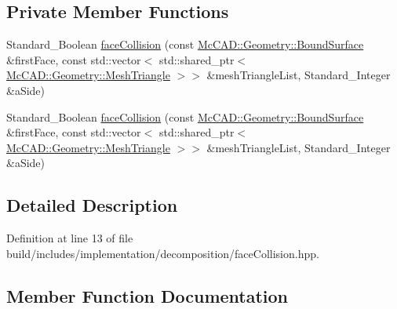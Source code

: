 \subsection*{Private Member Functions}
\begin{DoxyCompactItemize}
\item 
Standard\+\_\+\+Boolean \hyperlink{classMcCAD_1_1Decomposition_1_1FaceCollision_ab4dffccfd15895b37362d8f4a46dff0f}{face\+Collision} (const \hyperlink{classMcCAD_1_1Geometry_1_1BoundSurface}{Mc\+C\+A\+D\+::\+Geometry\+::\+Bound\+Surface} \&first\+Face, const std\+::vector$<$ std\+::shared\+\_\+ptr$<$ \hyperlink{classMcCAD_1_1Geometry_1_1MeshTriangle}{Mc\+C\+A\+D\+::\+Geometry\+::\+Mesh\+Triangle} $>$$>$ \&mesh\+Triangle\+List, Standard\+\_\+\+Integer \&a\+Side)
\item 
Standard\+\_\+\+Boolean \hyperlink{classMcCAD_1_1Decomposition_1_1FaceCollision_ab4dffccfd15895b37362d8f4a46dff0f}{face\+Collision} (const \hyperlink{classMcCAD_1_1Geometry_1_1BoundSurface}{Mc\+C\+A\+D\+::\+Geometry\+::\+Bound\+Surface} \&first\+Face, const std\+::vector$<$ std\+::shared\+\_\+ptr$<$ \hyperlink{classMcCAD_1_1Geometry_1_1MeshTriangle}{Mc\+C\+A\+D\+::\+Geometry\+::\+Mesh\+Triangle} $>$$>$ \&mesh\+Triangle\+List, Standard\+\_\+\+Integer \&a\+Side)
\end{DoxyCompactItemize}


\subsection{Detailed Description}


Definition at line 13 of file build/includes/implementation/decomposition/face\+Collision.\+hpp.



\subsection{Member Function Documentation}
\mbox{\label{classMcCAD_1_1Decomposition_1_1FaceCollision_ab4dffccfd15895b37362d8f4a46dff0f}} 
